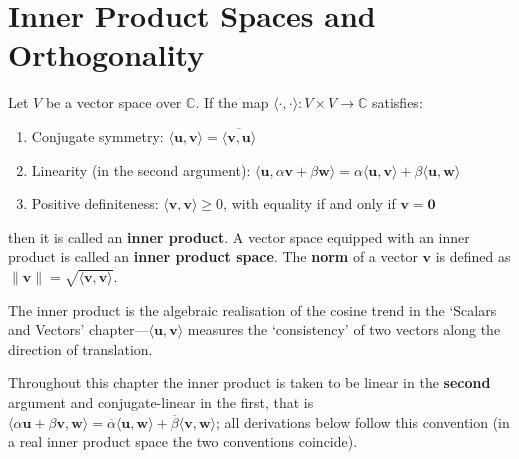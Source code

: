 \section{\texorpdfstring{Inner Product Spaces and Orthogonality}{Inner Product Spaces and Orthogonality}}

\begin{definition}\label{def:inner_product_space}
Let $V$ be a vector space over $\mathbb{C}$. If the map $\langle \cdot, \cdot \rangle: V \times V \to \mathbb{C}$ satisfies:
\begin{enumerate}[label=(\roman*)]
    \item Conjugate symmetry: $\langle \mathbf{u}, \mathbf{v} \rangle = \overline{\langle \mathbf{v}, \mathbf{u} \rangle}$
    \item Linearity (in the second argument): $\langle \mathbf{u}, \alpha \mathbf{v} + \beta \mathbf{w} \rangle = \alpha \langle \mathbf{u}, \mathbf{v} \rangle + \beta \langle \mathbf{u}, \mathbf{w} \rangle$
    \item Positive definiteness: $\langle \mathbf{v}, \mathbf{v} \rangle \ge 0$, with equality if and only if $\mathbf{v} = \mathbf{0}$
\end{enumerate}
then it is called an \textbf{inner product}. A vector space equipped with an inner product is called an \textbf{inner product space}. The \textbf{norm} of a vector $\mathbf{v}$ is defined as $\|\mathbf{v}\| = \sqrt{\langle \mathbf{v}, \mathbf{v} \rangle}$.

The inner product is the algebraic realisation of the cosine trend in the `Scalars and Vectors' chapter---$\langle \mathbf{u}, \mathbf{v} \rangle$ measures the `consistency' of two vectors along the direction of translation.

Throughout this chapter the inner product is taken to be linear in the \textbf{second} argument and conjugate-linear in the first, that is $\langle \alpha \mathbf{u} + \beta \mathbf{v}, \mathbf{w} \rangle = \overline{\alpha} \langle \mathbf{u}, \mathbf{w} \rangle + \overline{\beta} \langle \mathbf{v}, \mathbf{w} \rangle$; all derivations below follow this convention (in a real inner product space the two conventions coincide).
\end{definition}

